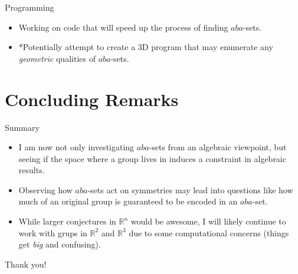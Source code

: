 \documentclass{beamer}
\begin{document}
\begin{frame}{Programming}
  \begin{itemize}
    \item Working on code that will speed up the process of finding $aba$-sets.


    \item *Potentially attempt to create a 3D program that may enumerate any \textit{geometric} qualities of $aba$-sets.


  \end{itemize}
\end{frame}


\section*{Concluding Remarks}

\begin{frame}{Summary}

  \begin{itemize}
  \item
    I am now not only investigating $aba$-sets from an algebraic viewpoint, but seeing if the \alert{space} where a group lives in induces a constraint in algebraic results.\newline
 

  \pause
  \item
    Observing how $aba$-sets act on symmetries may lead into questions like how much of an original group is guaranteed to be \alert{encoded} in an $aba$-set.\newline

  \pause

  \item
    While larger conjectures in $\mathbb{R}^n$ would be awesome, I will likely continue to work with grups in $\mathbb{R}^2$ and $\mathbb{R}^3$ due to some computational concerns (things get \textit{big} and confusing).


    
  \end{itemize}
  
\end{frame}

\begin{frame}
  
  \begin{center}
    {\Huge Thank you!}
  \end{center}

  

\end{frame}
\end{document}
